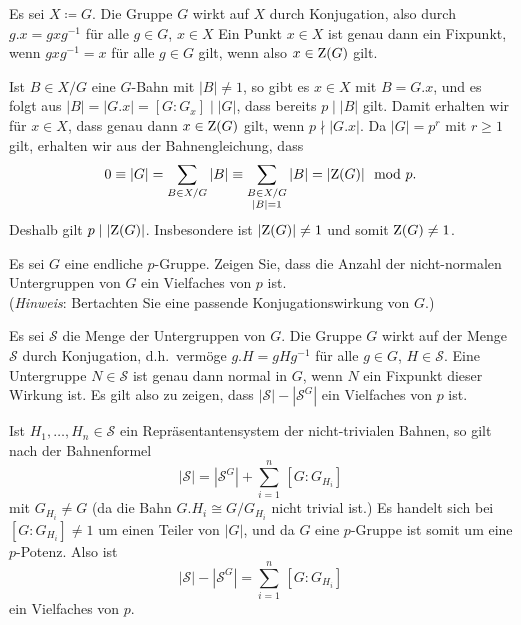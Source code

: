 \begin{solution}
  Es sei $X \coloneqq G$.
  Die Gruppe $G$ wirkt auf $X$ durch Konjugation, also durch $g.x = g x g^{-1}$ für alle $g \in G$, $x \in X$
  Ein Punkt $x \in X$ ist genau dann ein Fixpunkt, wenn $g x g^{-1} = x$ für alle $g \in G$ gilt, wenn also $x \in \operatorname{Z}(G)$ gilt.
  
  Ist $B \in X/G$ eine $G$-Bahn mit $|B| \neq 1$, so gibt es $x \in X$ mit $B = G.x$, und es folgt aus $|B| = |G.x| = [G : G_x] \mid |G|$, dass bereits $p \mid |B|$ gilt.
  Damit erhalten wir für $x \in X$, dass genau dann $x \in \operatorname{Z}(G)$ gilt, wenn $p \nmid |G.x|$.
  Da $|G| = p^r$ mit $r \geq 1$ gilt, erhalten wir aus der Bahnengleichung, dass
  \[
            0
    \equiv  |G|
    =       \sum_{B \in X/G} |B|
    \equiv  \sum_{\substack{B \in X/G \\ |B| = 1}} |B|
    =       |{\operatorname{Z}(G)}|
    \mod    p.
  \]
  Deshalb gilt $p \mid |{\operatorname{Z}(G)}|$.
  Insbesondere ist $|{\operatorname{Z}(G)}| \neq 1$ und somit $\operatorname{Z}(G) \neq 1$.
\end{solution}


\begin{question}[subtitle ={Nicht-normale Untergruppen einer $p$-Gruppe}]
  Es sei $G$ eine endliche $p$-Gruppe.
  Zeigen Sie, dass die Anzahl der nicht-normalen Untergruppen von $G$ ein Vielfaches von $p$ ist.\\
  (\emph{Hinweis}: Bertachten Sie eine passende Konjugationswirkung von $G$.)
\end{question}


\begin{solution}
  Es sei $\mathcal{S}$ die Menge der Untergruppen von $G$.
  Die Gruppe $G$ wirkt auf der Menge $\mathcal{S}$ durch Konjugation, d.h.\ vermöge $g.H = gHg^{-1}$ für alle $g \in G$, $H \in \mathcal{S}$.
  Eine Untergruppe $N \in \mathcal{S}$ ist genau dann normal in $G$, wenn $N$ ein Fixpunkt dieser Wirkung ist.
  Es gilt also zu zeigen, dass $|\mathcal{S}| - |\mathcal{S}^G|$ ein Vielfaches von $p$ ist.
  
  Ist $H_1, \dotsc, H_n \in \mathcal{S}$ ein Repräsentantensystem der nicht-trivialen Bahnen, so gilt nach der Bahnenformel
  \[
      |\mathcal{S}|
    = |\mathcal{S}^G| + \sum_{i=1}^n \, [G : G_{H_i}]
  \]
  mit $G_{H_i} \neq G$ (da die Bahn $G.H_i \cong G/G_{H_i}$ nicht trivial ist.)
  Es handelt sich bei $[G : G_{H_i}] \neq 1$ um einen Teiler von $|G|$, und da $G$ eine $p$-Gruppe ist somit um eine $p$-Potenz.
  Also ist
  \[
      |\mathcal{S}| - |\mathcal{S}^G|
    = \sum_{i=1}^n \, [G : G_{H_i}]
  \]
  ein Vielfaches von $p$.
\end{solution}


